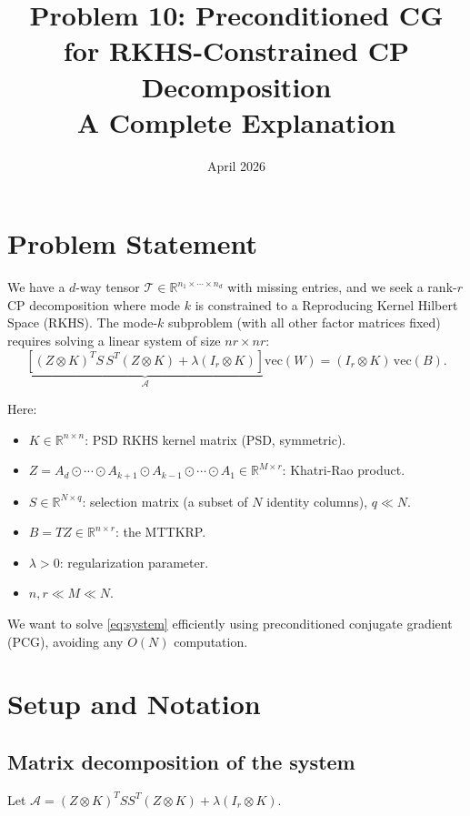 \documentclass[12pt]{article}
\title{Problem 10: Preconditioned CG for RKHS-Constrained CP Decomposition\\
\large A Complete Explanation}
\author{}
\date{April 2026}
\begin{document}
\maketitle

\section{Problem Statement}

We have a $d$-way tensor $\mathcal{T} \in \mathbb{R}^{n_1 \times \cdots \times n_d}$ with missing entries, and we seek a rank-$r$ CP decomposition where mode $k$ is constrained to a Reproducing Kernel Hilbert Space (RKHS). The mode-$k$ subproblem (with all other factor matrices fixed) requires solving a linear system of size $nr \times nr$:
\begin{equation}\label{eq:system}
\underbrace{\left[(Z \otimes K)^T S\, S^T (Z \otimes K) + \lambda(I_r \otimes K)\right]}_{\mathcal{A}} \mathrm{vec}(W) = (I_r \otimes K)\,\mathrm{vec}(B).
\end{equation}

Here:
\begin{itemize}
\item $K \in \mathbb{R}^{n \times n}$: PSD RKHS kernel matrix (PSD, symmetric).
\item $Z = A_d \odot \cdots \odot A_{k+1} \odot A_{k-1} \odot \cdots \odot A_1 \in \mathbb{R}^{M \times r}$: Khatri-Rao product.
\item $S \in \mathbb{R}^{N \times q}$: selection matrix (a subset of $N$ identity columns), $q \ll N$.
\item $B = TZ \in \mathbb{R}^{n \times r}$: the MTTKRP.
\item $\lambda > 0$: regularization parameter.
\item $n, r \ll M \ll N$.
\end{itemize}

We want to solve \eqref{eq:system} efficiently using preconditioned conjugate gradient (PCG), avoiding any $O(N)$ computation.

\section{Setup and Notation}

\subsection{Matrix decomposition of the system}

Let $\mathcal{A} = (Z \otimes K)^T S S^T (Z \otimes K) + \lambda (I_r \otimes K)$.
\end{document}
